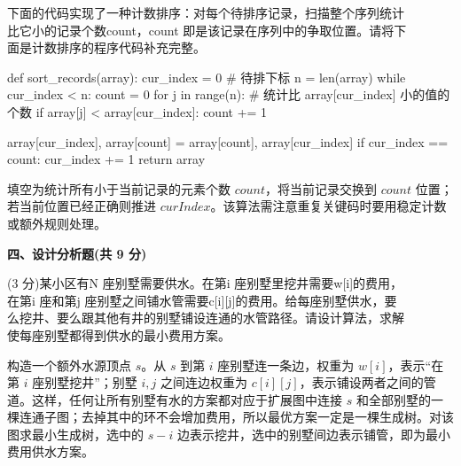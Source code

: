 \begin{question}
下面的代码实现了一种计数排序：对每个待排序记录，扫描整个序列统计\\
比它小的记录个数count，count 即是该记录在序列中的争取位置。请将下\\
面是计数排序的程序代码补充完整。
\begin{pycode}
def sort_records(array):
    cur_index = 0              # 待排下标
    n = len(array)
    while cur_index < n:
        count = 0
        for j in range(n):     # 统计比 array[cur_index] 小的值的个数
            if array[j] < array[cur_index]:
                count += 1

        array[cur_index], array[count] = array[count], array[cur_index]
        if cur_index == count:
            cur_index += 1
    return array
\end{pycode}

\begin{solution}
填空为统计所有小于当前记录的元素个数 $count$，将当前记录交换到 $count$ 位置；若当前位置已经正确则推进 $curIndex$。该算法需注意重复关键码时要用稳定计数或额外规则处理。
\end{solution}
\end{question}

\textbf{四、设计分析题(共 9 分)}
\begin{question}
(3 分)某小区有N 座别墅需要供水。在第i 座别墅里挖井需要w[i]的费用，\\
在第i 座和第j 座别墅之间铺水管需要c[i][j]的费用。给每座别墅供水，要\\
么挖井、要么跟其他有井的别墅铺设连通的水管路径。请设计算法，求解\\
使每座别墅都得到供水的最小费用方案。\\
\begin{solution}
构造一个额外水源顶点 $s$。从 $s$ 到第 $i$ 座别墅连一条边，权重为 $w[i]$，表示“在第 $i$ 座别墅挖井”；别墅 $i,j$ 之间连边权重为 $c[i][j]$，表示铺设两者之间的管道。这样，任何让所有别墅有水的方案都对应于扩展图中连接 $s$ 和全部别墅的一棵连通子图；去掉其中的环不会增加费用，所以最优方案一定是一棵生成树。对该图求最小生成树，选中的 $s-i$ 边表示挖井，选中的别墅间边表示铺管，即为最小费用供水方案。
\end{solution}
\end{question}

